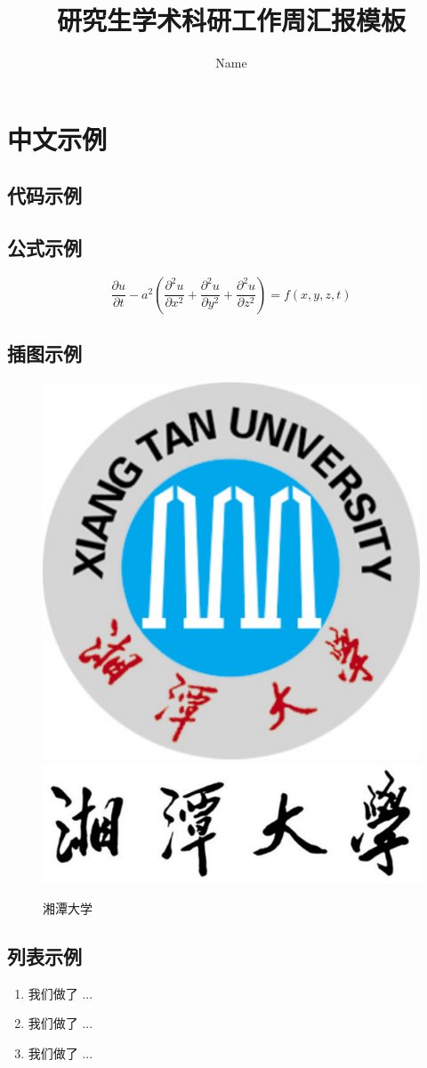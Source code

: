 \documentclass[12pt]{article}  %
\title{研究生学术科研工作周汇报模板}  %
\author{Name}
\begin{document}
\maketitle 


\section{中文示例}
\subsection{代码示例}


\subsection{公式示例}
\begin{equation}\label{eq:heat}
\frac{\partial u}{\partial t} - a^2 \left( \frac{\partial^2 u}{\partial x^2} + \frac{\partial^2 u}{\partial y^2} + \frac{\partial^2 u}{\partial z^2} \right) = f(x, y, z, t)
\end{equation}

\subsection{插图示例}
\begin{figure}[htbp]
  \centering
  \includegraphics[width=.2\textwidth]{./figures/xtu-fig-logo.pdf} \quad 
  \includegraphics[width=.6\textwidth]{./figures/xtu-text-logo.pdf}
\caption{湘潭大学}\label{fig:result}
\end{figure}

\subsection{列表示例}
\begin{enumerate}[\bfseries 1.]
    \item 我们做了 ...
    \item 我们做了 ...
    \item 我们做了 ...
\end{enumerate}
\end{document}
